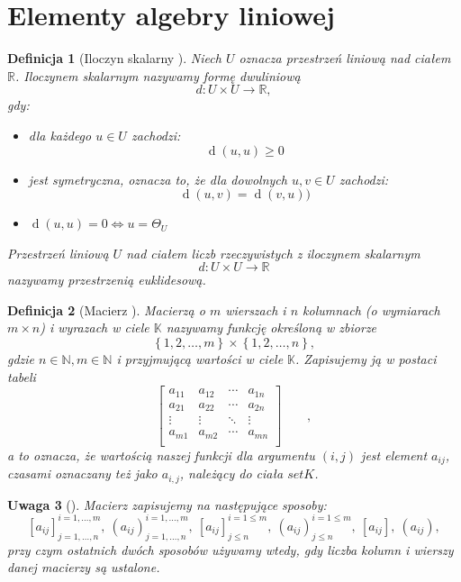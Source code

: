 \documentclass[12pt,a4paper]{report}
\newtheorem{df}{Definicja}[chapter]
\newtheorem{uwaga}[df]{Uwaga}
\newcommand{\set}[1]{\left\lbrace {#1} \right\rbrace}
\newcommand{\setR}{\mathbb{R}}
\newcommand{\setK}{\mathbb{K}}
\newcommand{\setN}{\mathbb{N}}
\newcommand{\distance}[2]{\operatorname{d}\left({#1}, {#2} \right)}
\begin{document}
\section{Elementy algebry liniowej}
\begin{df}[Iloczyn skalarny {\citep[Sec 14.3 Def. 14.7]{ealIII}}]
Niech $U$ oznacza przestrzeń liniową nad ciałem $\setR$. Iloczynem skalarnym nazywamy formę dwuliniową 
$$
d: U \times U \longrightarrow \setR,
$$
gdy:
\begin{itemize}
\item dla każdego $u \in U$ zachodzi:
$$
\distance{u}{u} \geq 0
$$
\item jest symetryczna, oznacza to, że dla dowolnych $u, v \in U$ zachodzi:
$$
\distance{u}{v}=\distance{v}{u})
$$

\item $\distance{u}{u}=0 \Leftrightarrow u = \Theta_{U}$
\end{itemize}
Przestrzeń liniową $U$ nad ciałem liczb rzeczywistych z iloczynem skalarnym 
$$
d: U \times U \longrightarrow \setR
$$ 
nazywamy przestrzenią euklidesową.
\end{df}

\begin{df}[Macierz {\citep[Sec 8.1 Def. 8.1]{alzega}}]
Macierzą o $m$ wierszach i $n$ kolumnach (o wymiarach $m \times n$) i wyrazach w ciele $\setK$ nazywamy funkcję określoną w zbiorze
$$
\set{1,2, \ldots ,m}\times \set{1,2, \ldots ,n},
$$
gdzie $n \in \setN, m \in \setN$ i przyjmującą wartości w ciele  $\setK$. Zapisujemy ją w postaci tabeli
$$
\left[
        \begin{array}{cccc}
         a_{11} & a_{12} & \cdots & a_{1n} \\
         a_{21} & a_{22} & \cdots & a_{2n} \\
         \vdots & \vdots & \ddots & \vdots \\
         a_{m1} & a_{m2} & \cdots & a_{mn} \\
         \end{array}
      \right]
      \qquad, 
$$
a to oznacza, że wartością naszej funkcji dla argumentu $(i,j)$ jest element $a_{ij}$, czasami oznaczany też jako $a_{i,j}$, należący do ciała $setK$.
\end{df}

\begin{uwaga}[{\citep[Sec 8.1]{alzega}}]
Macierz zapisujemy na następujące sposoby:
$$
[a_{ij}]_{j = 1, \ldots, n}^{i = 1, \ldots , m}, \: (a_{ij})_{j = 1, \ldots, n}^{i = 1, \ldots , m}, \: [a_{ij}]_{j \leq n}^{i = 1 \leq m}, \: (a_{ij})_{j \leq n}^{i = 1 \leq m}, \: [a_{ij}], \: (a_{ij}),
$$
przy czym ostatnich dwóch sposobów używamy wtedy, gdy liczba kolumn i wierszy danej macierzy są ustalone.
\end{uwaga}
\end{document}
